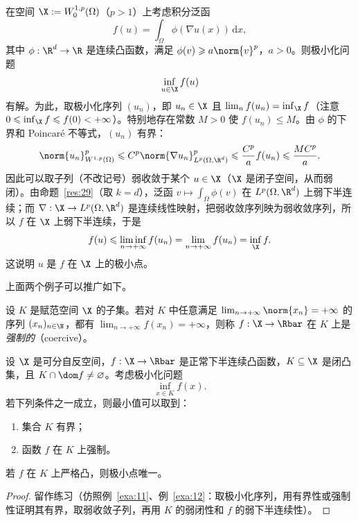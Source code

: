 \begin{example}[一个变分问题]
\label{exa:12}
在空间 $\X:=W_0^{1,p}(\Omega)$（$p>1$）上考虑积分泛函
\[
  f(u)=\int_\Omega\phi(\nabla u(x))\,\mathrm{d}x ,
\]
其中 $\phi:\R^d\to\R$ 是连续凸函数，满足 $\phi(v)\geqslant a\norm{v}^p$，$a>0$。则极小化问题
\[
  \inf_{u\in\X}f(u)
\]
有解。为此，取极小化序列 $(u_n)$，即 $u_n\in\X$ 且 $\lim_nf(u_n)=\inf_\X f$（注意 $0\leqslant\inf_\X f\leqslant f(0)<+\infty$）。特别地存在常数 $M>0$ 使 $f(u_n)\leqslant M$。由 $\phi$ 的下界和 Poincaré 不等式，$(u_n)$ 有界：
\[
  \norm{u_n}_{W^{1,p}(\Omega)}^p\leqslant C^p\norm{\nabla u_n}_{L^p(\Omega,\R^d)}^p\leqslant\frac{C^p}{a}f(u_n)\leqslant\frac{MC^p}{a} .
\]
因此可以取子列（不改记号）弱收敛于某个 $u\in\X$（$\X$ 是闭子空间，从而弱闭）。由命题~\ref{res:29}（取 $k=d$），泛函 $v\mapsto\int_\Omega\phi(v)$ 在 $L^p(\Omega,\R^d)$ 上弱下半连续；而 $\nabla:\X\to L^p(\Omega,\R^d)$ 是连续线性映射，把弱收敛序列映为弱收敛序列，所以 $f$ 在 $\X$ 上弱下半连续，于是
\[
  f(u)\leqslant\liminf_{n\to+\infty}f(u_n)=\lim_{n\to+\infty}f(u_n)=\inf_\X f .
\]
这说明 $u$ 是 $f$ 在 $\X$ 上的极小点。
\end{example}

上面两个例子可以推广如下。

\begin{definition}[强制性]
\label{def:20}
设 $K$ 是赋范空间 $\X$ 的子集。若对 $K$ 中任意满足 $\lim_{n\to+\infty}\norm{x_n}=+\infty$ 的序列 $(x_n)_{n\in\N}$，都有 $\lim_{n\to+\infty}f(x_n)=+\infty$，则称 $f:\X\to\Rbar$ 在 $K$ 上是\emph{强制的}（coercive）。
\end{definition}

\begin{proposition}
\label{res:30}
设 $\X$ 是可分自反空间，$f:\X\to\Rbar$ 是正常下半连续凸函数，$K\subseteq\X$ 是闭凸集，且 $K\cap\dom f\neq\varnothing$。考虑极小化问题
\[
  \inf_{x\in K}f(x).
\]
若下列条件之一成立，则最小值可以取到：
\begin{enumerate}[label=\alph*.]
  \item 集合 $K$ 有界；
  \item 函数 $f$ 在 $K$ 上强制。
\end{enumerate}
若 $f$ 在 $K$ 上严格凸，则极小点唯一。
\end{proposition}

\begin{proof}
留作练习（仿照例~\ref{exa:11}、例~\ref{exa:12}：取极小化序列，用有界性或强制性证明其有界，取弱收敛子列，再用 $K$ 的弱闭性和 $f$ 的弱下半连续性）。
\end{proof}

